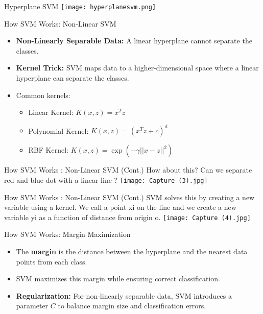\documentclass[serif, aspectratio=169]{beamer}
\begin{document}
\begin{frame}{Hyperplane SVM}
    \centering
    \texttt{[image: hyperplanesvm.png]}
\end{frame}



\begin{frame}{How SVM Works: Non-Linear SVM}
    \begin{itemize}
        \item \textbf{Non-Linearly Separable Data:} A linear hyperplane cannot separate the classes.
        \item \textbf{Kernel Trick:} SVM maps data to a higher-dimensional space where a linear hyperplane can separate the classes.
        \item Common kernels:
        \begin{itemize}
            \item Linear Kernel: \( K(x, z) = x^T z \)
            \item Polynomial Kernel: \( K(x, z) = (x^T z + c)^d \)
            \item RBF Kernel: \( K(x, z) = \exp(-\gamma ||x - z||^2) \)
        \end{itemize}
    \end{itemize}
\end{frame}

\begin{frame}{How SVM Works : Non-Linear SVM (Cont.)}
    How about this? Can we separate red and blue dot with a linear line ?
    \centering
    \texttt{[image: Capture (3).jpg]}
\end{frame}

\begin{frame}{How SVM Works : Non-Linear SVM (Cont.)}
    SVM solves this by creating a new variable using a kernel. We call a point xi on the line and we create a new variable yi as a function of distance from origin o.
    \centering
    \texttt{[image: Capture (4).jpg]}
\end{frame}



\begin{frame}{How SVM Works: Margin Maximization}
    \begin{itemize}
        \item The \textbf{margin} is the distance between the hyperplane and the nearest data points from each class.
        \item SVM maximizes this margin while ensuring correct classification.
        \item \textbf{Regularization:} For non-linearly separable data, SVM introduces a parameter \( C \) to balance margin size and classification errors.
    \end{itemize}
\end{frame}
\end{document}
